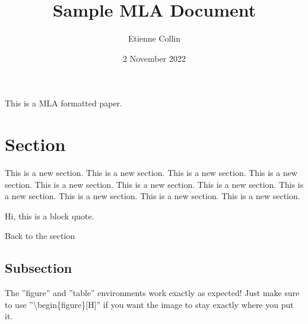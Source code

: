 \documentclass[mla8]{mla}                               %
\title{Sample MLA Document}
\author{Etienne Collin}
\date{2 November 2022}
\begin{document}
\begin{paper}

This is a MLA formatted paper.

\section{Section}
This is a new section. This is a new section. This is a new section. This is a new section. This is a new section. This is a new section. This is a new section. This is a new section. This is a new section. This is a new section. This is a new section.
\begin{blockquote}
    Hi, this is a block quote. \cite[3]{labuteShapeThings2001}
\end{blockquote}
Back to the section

\subsection{Subsection}
The ''figure'' and ''table'' environments work exactly as expected! Just make sure to use ''\textbackslash{}begin\{figure\}[H]'' if you want the image to stay exactly where you put it.


\end{paper}

\begin{notes}
    \printendnotes
\end{notes}

\begin{workscited}
    \printbibliography[heading=none]
\end{workscited}
\end{document}
